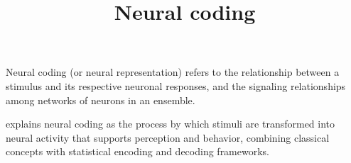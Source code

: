 \documentclass[a4paper]{article}
\title{Neural coding}
\date{}
\begin{document}
    \maketitle
    
    Neural coding (or neural representation) refers to the relationship between a stimulus and its respective neuronal responses, and the signaling relationships among networks of neurons in an ensemble. 
    
    \cite{shimazaki-2025-neural-coding-foundational-concepts-statistical-formulations-and-recent-advances} explains neural coding as the process by which stimuli are transformed into neural activity that supports perception and behavior, combining classical concepts with statistical encoding and decoding frameworks.
    
    
    
    
    
    
    
\end{document}
